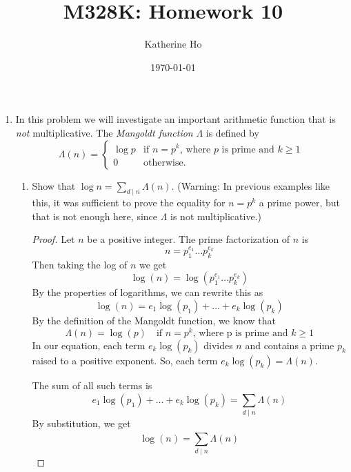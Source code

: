 \documentclass[11pt]{article}
\title{M328K: Homework 10}
\author{Katherine Ho}
\date\today
\theoremstyle{definition}
\begin{document}
\maketitle

\begin{enumerate}
    \item In this problem we will investigate an important arithmetic function that is \emph{not} multiplicative. The \emph{Mangoldt function} $\Lambda$ is defined by
$$
\Lambda(n) = \begin{cases}
    \log p & \text{if $n=p^k$, where $p$ is prime and $k\geq 1$} \\
    0 & \text{otherwise.}
\end{cases}
$$
\begin{enumerate}
    \item Show that $\log n = \sum_{d\mid n} \Lambda(n)$. (Warning: In previous examples like this, it was sufficient to prove the equality for $n=p^k$ a prime power, but that is not enough here, since $\Lambda$ is not multiplicative.)
    \begin{proof}
        Let $n$ be a positive integer. The prime factorization of $n$ is 
        \[
            n = p_1^{e_1}\dots p_k^{e_k}
        \]
        Then taking the log of $n$ we get 
        \[
            \log(n) = \log(p_1^{e_1}\dots p_k^{e_k})
        \]
        By the properties of logarithms, we can rewrite this as 
        \[
            \log(n) = e_1\log(p_1) + \dots + e_k\log(p_k)
        \]
        By the definition of the Mangoldt function, we know that 
        \[
            \Lambda(n) = \log(p) \quad\text{if } n=p^k \text{, where p is prime and } k\ge 1
        \]
        In our equation, each term $e_k\log(p_k)$ divides $n$ and contains a prime $p_k$ raised to a positive exponent. 
        So, each term $e_k\log(p_k) = \Lambda(n)$. 
        
        The sum of all such terms is 
        \[
            e_1\log(p_1) + \dots + e_k\log(p_k) = \sum_{d\mid n}^{}\Lambda(n)
        \]
        By substitution, we get 
        \[
            \log(n) = \sum_{d\mid n}^{}\Lambda(n)
        \]

    \end{proof}
    \newpage


\end{enumerate}
\end{enumerate}
\end{document}
